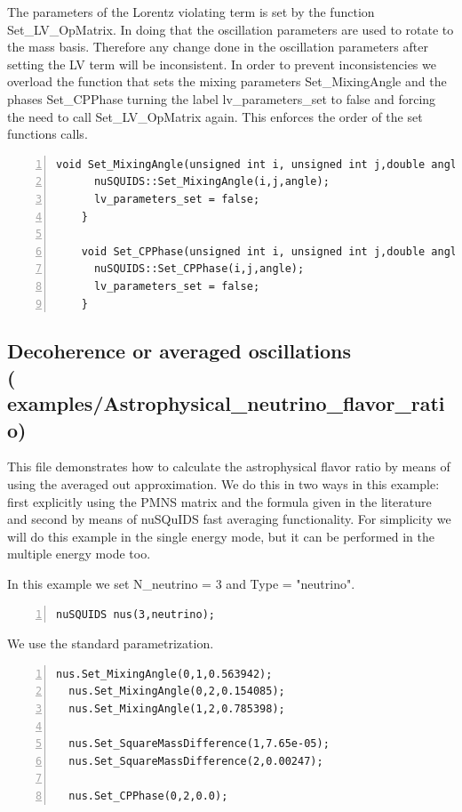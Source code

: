 \documentclass[3p,12pt]{elsarticle}
\newcommand{\ttf}{\ttfamily}
\begin{document}
The parameters of the Lorentz violating term is set by the function
{\ttf Set\_LV\_OpMatrix}. In doing that the oscillation parameters are
used to rotate to the mass basis. Therefore any change done in the
oscillation parameters after setting the LV term will be inconsistent.
In order to prevent inconsistencies we overload the function that sets
the mixing parameters {\ttf Set\_MixingAngle} and the phases {\ttf
  Set\_CPPhase} turning the label {\ttf lv\_parameters\_set} to {\ttf
  false} and forcing the need to call {\ttf Set\_LV\_OpMatrix} again.
This enforces the order of the set functions calls.

\begin{lstlisting}[frame=leftline, numbers =
  left,breaklines=true,label = ex:sin1,firstnumber=last]
    void Set_MixingAngle(unsigned int i, unsigned int j,double angle){
      nuSQUIDS::Set_MixingAngle(i,j,angle);
      lv_parameters_set = false;
    }

    void Set_CPPhase(unsigned int i, unsigned int j,double angle){
      nuSQUIDS::Set_CPPhase(i,j,angle);
      lv_parameters_set = false;
    }
\end{lstlisting}

\subsection{Decoherence or averaged oscillations\\ \textnormal{({\ttf
      examples/Astrophysical\_neutrino\_flavor\_ratio})}}

This file demonstrates how to calculate the astrophysical flavor ratio by means
of using the averaged out approximation. We do this in two ways in this
example: first explicitly using the PMNS matrix and the formula given
in the literature and second by means of nuSQuIDS fast averaging functionality.
For simplicity we will do this example in the single energy mode, but it
can be performed in the multiple energy mode too.


In this example we set {\ttf N\_neutrino = 3} and {\ttf Type = "neutrino"}.

\begin{lstlisting}[frame=leftline, numbers =
  left,breaklines=true,label = ex:sin1]
  nuSQUIDS nus(3,neutrino);
\end{lstlisting}

We use the standard parametrization.

\begin{lstlisting}[frame=leftline, numbers =
  left,breaklines=true,label = ex:sin1]
  nus.Set_MixingAngle(0,1,0.563942);
  nus.Set_MixingAngle(0,2,0.154085);
  nus.Set_MixingAngle(1,2,0.785398);

  nus.Set_SquareMassDifference(1,7.65e-05);
  nus.Set_SquareMassDifference(2,0.00247);
  
  nus.Set_CPPhase(0,2,0.0);
\end{lstlisting}
\end{document}
